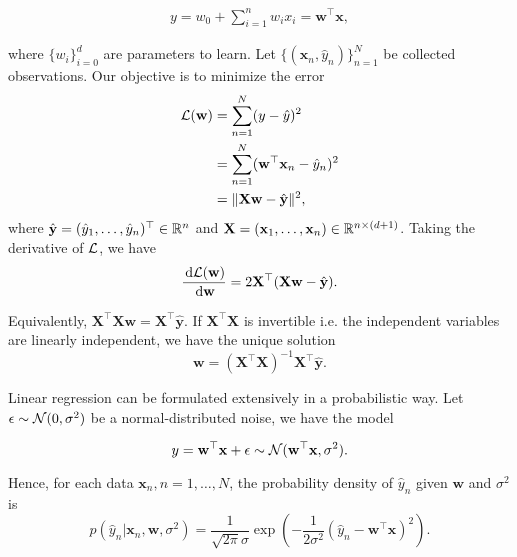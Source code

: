 \begin{equation}
 \begin{aligned}
  y = w_0 + \sum\limits_{i=1}^n w_ix_i = \mathbf{w}^\top\mathbf{x},
 \end{aligned}
\end{equation}

where $\{w_i\}_{i=0}^d$ are parameters to learn. Let $\{(\mathbf{x}_n, \hat{y}_n)\}_{n=1}^N$ be collected observations. Our objective is to minimize the error
\begin{equation}
 \begin{aligned}
  \mathcal{L}(\mathbf{w})
   & = \sum\limits_{n=1}^N (y-\hat{y})^2                                                              \\
   & = \sum\limits_{n=1}^N (\mathbf{w}^\top \mathbf{x}_n-\hat{y}_n)^2                                 \\
   & = \|\mathbf{X} \mathbf{w} - \hat{\mathbf{y}}\|^2                                               ,
 \end{aligned}
\end{equation}
where $\hat{\mathbf{y}} = (\hat{y}_1,\ldots,\hat{y}_n)^\top \in \mathbb{R}^n$ and $\mathbf{X} = (\mathbf{x}_1,\ldots,\mathbf{x}_n)\in\mathbb{R}^{n\times(d+1)}$.
Taking the derivative of $\mathcal{L}$, we have
$$\dfrac{\,\mathrm{d}\mathcal{L}(\mathbf{w})}{\,\mathrm{d} \mathbf{w}} = 2\mathbf{X}^\top(\mathbf{X} \mathbf{w} - \hat{\mathbf{y}}).$$

Equivalently, $\mathbf{X}^\top \mathbf{X} \mathbf{w} =  \mathbf{X}^\top\hat{\mathbf{y}}$. If $\mathbf{X}^\top \mathbf{X}$ is invertible i.e. the independent variables are linearly independent, we have the unique solution
\begin{equation}
 \mathbf{w} = (\mathbf{X}^\top \mathbf{X})^{-1}\mathbf{X}^\top\hat{\mathbf{y}}.
\end{equation}

Linear regression can be formulated extensively in a probabilistic way. Let $\epsilon\sim\mathcal{N}(0,\sigma^2)$ be a normal-distributed noise, we have the model

\begin{equation}
 y = \mathbf{w}^\top\mathbf{x} + \epsilon \sim \mathcal{N}(\mathbf{w}^\top\mathbf{x}, \sigma^2).
\end{equation}

Hence, for each data $\mathbf{x}_n, n=1,\ldots, N$, the probability density of $\hat{y}_n$ given $\mathbf{w}$ and $\sigma^2$ is
\begin{equation}
 p(\hat{y}_n | \mathbf{x}_n, \mathbf{w}, \sigma^2) = \dfrac{1}{\sqrt{2\pi}\sigma}\exp\left(-\dfrac{1}{2\sigma^2}(\hat{y}_n - \mathbf{w}^\top\mathbf{x})^2\right).
\end{equation}

